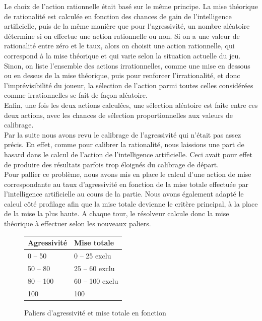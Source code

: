 \documentclass{report}
\begin{document}
Le choix de l'action rationnelle était basé sur le même principe. La mise théorique de rationalité est calculée en fonction des chances de gain de l'intelligence artificielle, puis de la même manière que pour l'agressivité, un nombre aléatoire détermine si on effectue une action rationnelle ou non. Si on a une valeur de rationalité entre zéro et le taux, alors on choisit une action rationnelle, qui correspond à la mise théorique et qui varie selon la situation actuelle du jeu. Sinon, on liste l'ensemble des actions irrationnelles, comme une mise en dessous ou en dessus de la mise théorique, puis pour renforcer l’irrationalité, et donc l'imprévisibilité du joueur, la sélection de l'action parmi toutes celles considérées comme irrationnelles se fait de façon aléatoire.\\

Enfin, une fois les deux actions calculées, une sélection aléatoire est faite entre ces deux actions, avec les chances de sélection proportionnelles aux valeurs de calibrage.\\

Par la suite nous avons revu le calibrage de l'agressivité qui n'était pas assez précis. En effet, comme pour calibrer la rationalité, nous laissions une part de hasard dans le calcul de l'action de l'intelligence artificielle. Ceci avait pour effet de produire des résultats parfois trop éloignés du calibrage de départ.\\

Pour pallier ce problème, nous avons mis en place le calcul d'une action de mise correspondante au taux d'agressivité en fonction de la mise totale effectuée par l'intelligence artificielle au cours de la partie. Nous avons également adapté le calcul côté profilage afin que la mise totale devienne le critère principal, à la place de la mise la plus haute.
A chaque tour, le résolveur calcule donc la mise théorique à effectuer selon les nouveaux paliers.\par


\begin{figure}[H]
\begin{center}
\begin{tabular}{|l|l|}
	\hline
   Agressivité & Mise totale \\
   \hline
   0 – 50 & 0 – 25	exclu \\
   \hline
   50 – 80 & 25 – 60 exclu\\
   \hline
   80 – 100 & 60 – 100 exclu\\
   \hline
   100 & 100\\
   \hline
\end{tabular}	
\end{center}
\caption{Paliers d'agressivité et mise totale en fonction}
\end{figure}
\end{document}
